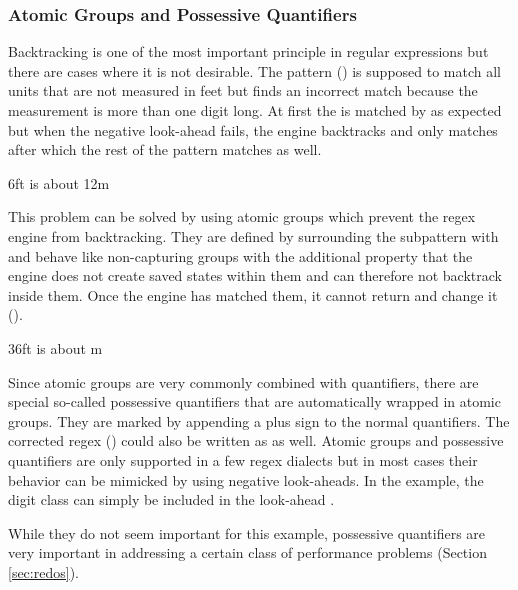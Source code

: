 \subsubsection{Atomic Groups and Possessive Quantifiers}

Backtracking is one of the most important principle in regular expressions but there are cases where it is not desirable. The pattern (\textbf{}) is supposed to match all units that are not measured in feet but finds an incorrect match because the measurement is more than one digit long. At first the  is matched by  as expected but when the negative look-ahead fails, the engine backtracks and only matches  after which the rest of the pattern matches as well.

\begin{listingBoxFigure}[title={Backtracking leads to incorrect match with \pattern{\bs d+(?!ft)}},label=fig:regexNonPossessive,width=14cm,center]
    6ft is about 12m
\end{listingBoxFigure}

This problem can be solved by using atomic groups which prevent the regex engine from backtracking. They are defined by surrounding the subpattern with  and behave like non-capturing groups with the additional property that the engine does not create saved states within them and can therefore not backtrack inside them. Once the engine has matched them, it cannot return and change it ().

\begin{listingBoxFigure}[title={Atomic groups \pattern{(?>\bs d+)(?!ft)} prevent backtracking},label=fig:regexPossessive,width=14cm,center]
    36ft is about m
\end{listingBoxFigure}

Since atomic groups are very commonly combined with quantifiers, there are special so-called possessive quantifiers that are automatically wrapped in atomic groups. They are marked by appending a plus sign to the normal quantifiers. The corrected regex () could also be written as  as well. Atomic groups and possessive quantifiers are only supported in a few regex dialects but in most cases their behavior can be mimicked by using negative look-aheads. In the example, the digit class can simply be included in the look-ahead .

While they do not seem important for this example, possessive quantifiers are very important in addressing a certain class of performance problems (Section \ref{sec:redos}).
